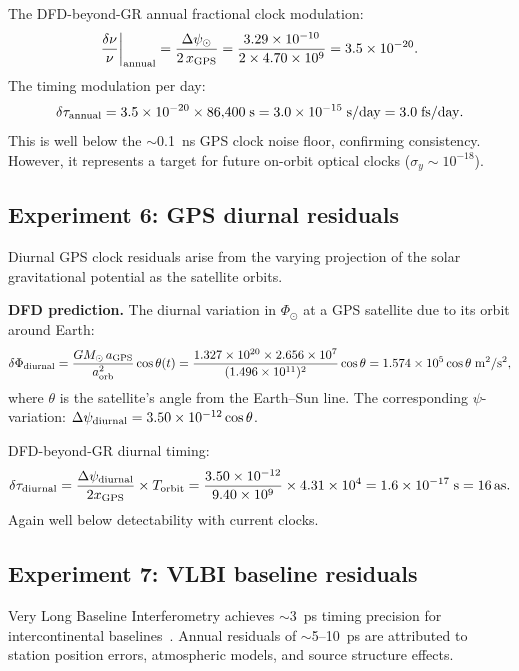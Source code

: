 \documentclass[aps,prd,twocolumn,superscriptaddress,nofootinbib,longbibliography]{revtex4-2}
\newcommand{\as}{\,\mathrm{as}}
\begin{document}
The DFD-beyond-GR annual fractional clock modulation:
\begin{equation}
\frac{\delta\nu}{\nu}\bigg|_{\rm annual} = \frac{\Delta\psi_\odot}{2\,x_{\rm GPS}}
= \frac{3.29\times10^{-10}}{2\times4.70\times10^{9}} = 3.5\times10^{-20}.
\end{equation}
The timing modulation per day:
\begin{equation}
\delta\tau_{\rm annual} = 3.5\times10^{-20}\times 86{,}400\;\si{s}
= 3.0\times10^{-15}\;\si{s/day} = 3.0\;\si{fs/day}.
\end{equation}
This is well below the $\sim$0.1~ns GPS clock noise floor, confirming
consistency. However, it represents a target for future on-orbit
optical clocks ($\sigma_y \sim 10^{-18}$).

\subsection{Experiment 6: GPS diurnal residuals}\label{sec:GPS-diurnal}

Diurnal GPS clock residuals arise from the varying projection of the
solar gravitational potential as the satellite orbits.

\textbf{DFD prediction.} The diurnal variation in $\Phi_\odot$ at a
GPS satellite due to its orbit around Earth:
\begin{equation}
\delta\Phi_{\rm diurnal} = \frac{GM_\odot\,a_{\rm GPS}}{a_{\rm orb}^2}\cos\theta(t)
= \frac{1.327\times10^{20}\times2.656\times10^7}{(1.496\times10^{11})^2}\cos\theta
= 1.574\times10^5\cos\theta\;\si{m^2/s^2},
\end{equation}
where $\theta$ is the satellite's angle from the Earth--Sun line. The
corresponding $\psi$-variation: $\Delta\psi_{\rm diurnal} = 3.50\times10^{-12}\cos\theta$.

DFD-beyond-GR diurnal timing:
\begin{equation}
\delta\tau_{\rm diurnal} = \frac{\Delta\psi_{\rm diurnal}}{2x_{\rm GPS}}\times T_{\rm orbit}
= \frac{3.50\times10^{-12}}{9.40\times10^9}\times 4.31\times10^4
= 1.6\times10^{-17}\;\si{s} = 16\as.
\end{equation}
Again well below detectability with current clocks.

\subsection{Experiment 7: VLBI baseline residuals}\label{sec:VLBI}

Very Long Baseline Interferometry achieves $\sim$3~ps timing precision
for intercontinental baselines~\cite{Schuh2012}. Annual residuals of
$\sim$5--10~ps are attributed to station position errors, atmospheric
models, and source structure effects.
\end{document}
